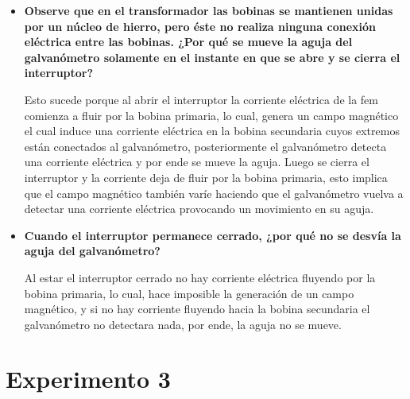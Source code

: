 \documentclass[letterpaper, 12pt]{report}
\begin{document}
\begin{itemize}[label=$\bullet$]
      \item \textbf{Observe que en el transformador las bobinas se mantienen
                  unidas por un núcleo de hierro, pero éste no realiza
                  ninguna conexión eléctrica entre las bobinas. ¿Por qué se
                  mueve la aguja del galvanómetro solamente en el instante en
                  que se abre y se cierra el interruptor?}

            Esto sucede porque al abrir el interruptor la corriente
            eléctrica de la fem comienza a fluir por la bobina
            primaria, lo cual, genera un campo magnético el cual induce
            una corriente eléctrica en la bobina secundaria cuyos
            extremos están conectados al galvanómetro, posteriormente
            el galvanómetro detecta una corriente eléctrica y por ende
            se mueve la aguja. Luego se cierra el interruptor y la
            corriente deja de fluir por la bobina primaria, esto
            implica que el campo magnético también varíe haciendo que
            el galvanómetro vuelva a detectar una corriente eléctrica
            provocando un movimiento en su aguja.

      \item \textbf{Cuando el interruptor permanece cerrado, ¿por qué no se
                  desvía la aguja del galvanómetro?}

            Al estar el interruptor cerrado no hay corriente eléctrica
            fluyendo por la bobina primaria, lo cual, hace imposible la
            generación de un campo magnético, y si no hay corriente
            fluyendo hacia la bobina secundaria el galvanómetro no
            detectara nada, por ende, la aguja no se mueve.
\end{itemize}

\section*{Experimento 3}
\end{document}
